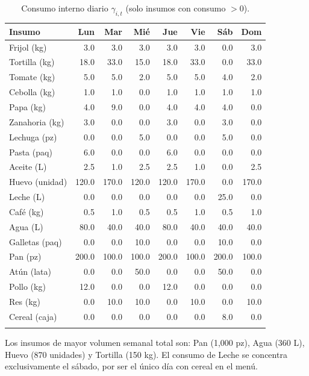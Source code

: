 \documentclass[12pt, a4paper]{article}
\begin{document}
\begin{longtable}{lrrrrrrr}
\toprule
\textbf{Insumo} & \textbf{Lun} & \textbf{Mar} & \textbf{Mié} & \textbf{Jue} & \textbf{Vie} & \textbf{Sáb} & \textbf{Dom} \\
\midrule
\endhead
\bottomrule
\endfoot
Frijol (kg)     &  3.0 &  3.0 &  3.0 &  3.0 &  3.0 &  0.0 &  3.0 \\
Tortilla (kg)   & 18.0 & 33.0 & 15.0 & 18.0 & 33.0 &  0.0 & 33.0 \\
Tomate (kg)     &  5.0 &  5.0 &  2.0 &  5.0 &  5.0 &  4.0 &  2.0 \\
Cebolla (kg)    &  1.0 &  1.0 &  0.0 &  1.0 &  1.0 &  1.0 &  1.0 \\
Papa (kg)       &  4.0 &  9.0 &  0.0 &  4.0 &  4.0 &  4.0 &  0.0 \\
Zanahoria (kg)  &  3.0 &  0.0 &  0.0 &  3.0 &  0.0 &  3.0 &  0.0 \\
Lechuga (pz)    &  0.0 &  0.0 &  5.0 &  0.0 &  0.0 &  5.0 &  0.0 \\
Pasta (paq)     &  6.0 &  0.0 &  0.0 &  6.0 &  0.0 &  0.0 &  0.0 \\
Aceite (L)      &  2.5 &  1.0 &  2.5 &  2.5 &  1.0 &  0.0 &  2.5 \\
Huevo (unidad)  &120.0 &170.0 &120.0 &120.0 &170.0 &  0.0 &170.0 \\
Leche (L)       &  0.0 &  0.0 &  0.0 &  0.0 &  0.0 & 25.0 &  0.0 \\
Café (kg)       &  0.5 &  1.0 &  0.5 &  0.5 &  1.0 &  0.5 &  1.0 \\
Agua (L)        & 80.0 & 40.0 & 40.0 & 80.0 & 40.0 & 40.0 & 40.0 \\
Galletas (paq)  &  0.0 &  0.0 & 10.0 &  0.0 &  0.0 & 10.0 &  0.0 \\
Pan (pz)        &200.0 &100.0 &100.0 &200.0 &100.0 &200.0 &100.0 \\
Atún (lata)     &  0.0 &  0.0 & 50.0 &  0.0 &  0.0 & 50.0 &  0.0 \\
Pollo (kg)      & 12.0 &  0.0 &  0.0 & 12.0 &  0.0 &  0.0 &  0.0 \\
Res (kg)        &  0.0 & 10.0 & 10.0 &  0.0 & 10.0 &  0.0 & 10.0 \\
Cereal (caja)   &  0.0 &  0.0 &  0.0 &  0.0 &  0.0 &  8.0 &  0.0 \\
\caption{Consumo interno diario $\gamma_{i,t}$ (solo insumos con consumo $> 0$).}
\label{tab:consumo}
\end{longtable}

\noindent Los insumos de mayor volumen semanal total son: Pan (1{,}000 pz),
Agua (360 L), Huevo (870 unidades) y Tortilla (150 kg). El consumo de Leche
se concentra exclusivamente el sábado, por ser el único día con cereal en el menú.
\end{document}
